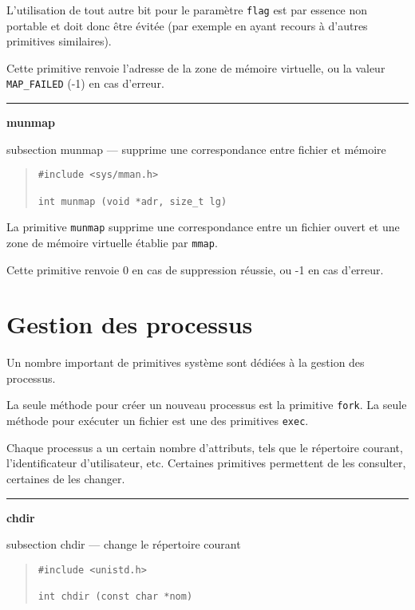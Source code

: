 \documentclass [twoside] {report}
\newcommand {\primitive} [1]
    {
	\phantomsection
	{\large \bf #1}
	\addcontentsline {toc} {subsection} {#1}
    }
\newcommand {\separation}
    {
	\vspace {5mm}
	\nopagebreak
	\hrule
    }
\begin{document}
L'utilisation de tout autre bit pour le paramètre \texttt {flag} est
par essence non portable et doit donc être évitée (par exemple en
ayant recours à d'autres primitives similaires).

Cette primitive renvoie l'adresse de la zone de mémoire virtuelle, ou
la valeur \texttt {MAP\_FAILED} (-1) en cas d'erreur.


\separation
\primitive {munmap} --- supprime une correspondance entre fichier et mémoire

\begin {quote}
\begin {verbatim}
#include <sys/mman.h>

int munmap (void *adr, size_t lg)
\end{verbatim}
\end {quote}

La primitive {\tt munmap} supprime une correspondance entre un fichier
ouvert et une zone de mémoire virtuelle établie par \texttt {mmap}.

Cette primitive renvoie 0 en cas de suppression réussie, ou -1 en
cas d'erreur.



\section {Gestion des processus}


Un nombre important de primitives système sont
dédiées à la gestion des processus.

La seule méthode pour créer un nouveau processus
est la primitive {\tt fork}. La seule méthode pour
exécuter un fichier est une des primitives
{\tt exec}.

Chaque processus a un certain nombre
d'attributs, tels que le répertoire courant,
l'identificateur d'utilisateur, etc. Certaines
primitives permettent de les consulter, certaines
de les changer.


\separation
\primitive {chdir} --- change le répertoire courant

\begin {quote}
\begin {verbatim}
#include <unistd.h>

int chdir (const char *nom)
\end{verbatim}
\end {quote}
\end{document}
